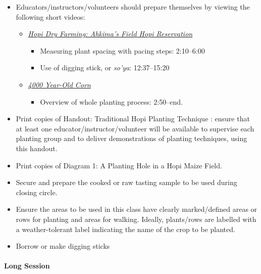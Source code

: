 \documentclass[12pt,]{article}
\providecommand{\tightlist}{%
  \setlength{\itemsep}{0pt}\setlength{\parskip}{0pt}}
\let\oldparagraph\paragraph
\renewcommand{\paragraph}[1]{\oldparagraph{#1}\mbox{}}
\begin{document}
\begin{itemize}
\tightlist
\item
  Educators/instructors/volunteers should prepare themselves by viewing the following short videos:

  \begin{itemize}
  \item
    \href{https://www.youtube.com/watch?v=LWm2AExHLik}{\emph{Hopi Dry Farming: Ahkima's Field Hopi Reservation}}

    \begin{itemize}
    \tightlist
    \item
      Measuring plant spacing with pacing steps: 2:10--6:00
    \item
      Use of digging stick, or \emph{so'ya}: 12:37--15:20
    \end{itemize}
  \item
    \href{https://www.youtube.com/watch?v=1MaSSSwWwKQ}{\emph{4000 Year-Old Corn}}

    \begin{itemize}
    \tightlist
    \item
      Overview of whole planting process: 2:50--end.
    \end{itemize}
  \end{itemize}
\item
  Print copies of Handout: Traditional Hopi Planting Technique : ensure that at least one educator/instructor/volunteer will be available to supervise each planting group and to deliver demonstrations of planting techniques, using this handout.
\item
  Print copies of Diagram 1: A Planting Hole in a Hopi Maize Field.
\item
  Secure and prepare the cooked or raw tasting sample to be used during closing circle.
\item
  Ensure the areas to be used in this class have clearly marked/defined areas or rows for
  planting and areas for walking. Ideally, plants/rows are labelled with a weather-tolerant
  label indicating the name of the crop to be planted.
\item
  Borrow or make digging sticks
\end{itemize}

\hypertarget{long-session-1}{%
\paragraph{Long Session}\label{long-session-1}}
\end{document}
